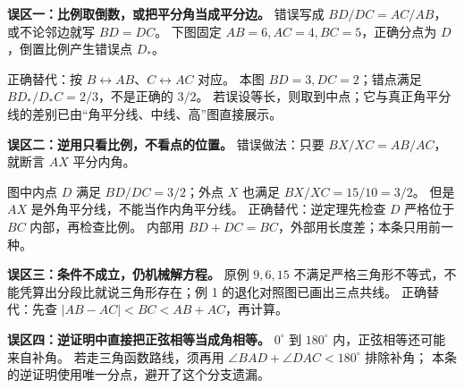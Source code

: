 \clearpage
\begin{trapbox}
\textbf{误区一：比例取倒数，或把平分角当成平分边。}
错误写成 $BD/DC=AC/AB$，或不论邻边就写 $BD=DC$。
下图固定 $AB=6,AC=4,BC=5$，正确分点为 $D$，倒置比例产生错误点 $D_*$。

正确替代：按 $B\leftrightarrow AB$、$C\leftrightarrow AC$ 对应。
本图 $BD=3,DC=2$；错点满足 $BD_*/D_*C=2/3$，不是正确的 $3/2$。
若误设等长，则取到中点；它与真正角平分线的差别已由“角平分线、中线、高”图直接展示。

\tcbbreak
\textbf{误区二：逆用只看比例，不看点的位置。}
错误做法：只要 $BX/XC=AB/AC$，就断言 $AX$ 平分内角。

图中内点 $D$ 满足 $BD/DC=3/2$；外点 $X$ 也满足 $BX/XC=15/10=3/2$。
但是 $AX$ 是外角平分线，不能当作内角平分线。
正确替代：逆定理先检查 $D$ 严格位于 $BC$ 内部，再检查比例。
内部用 $BD+DC=BC$，外部用长度差；本条只用前一种。

\textbf{误区三：条件不成立，仍机械解方程。}
原例 $9,6,15$ 不满足严格三角形不等式，不能凭算出分段比就说三角形存在；例 1 的退化对照图已画出三点共线。
正确替代：先查 $|AB-AC|<BC<AB+AC$，再计算。

\textbf{误区四：逆证明中直接把正弦相等当成角相等。}
$0^\circ$ 到 $180^\circ$ 内，正弦相等还可能来自补角。
若走三角函数路线，须再用 $\angle BAD+\angle DAC<180^\circ$ 排除补角；
本条的逆证明使用唯一分点，避开了这个分支遗漏。
\end{trapbox}
